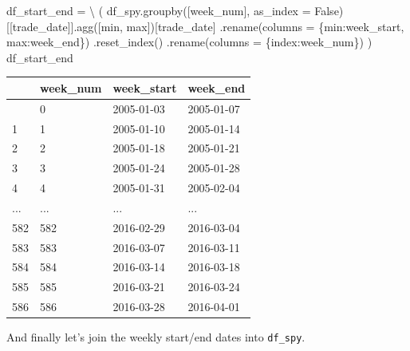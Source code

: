 \documentclass[
  letterpaper,
  DIV=11,
  numbers=noendperiod]{scrreprt}
\newenvironment{Shaded}{\begin{snugshade}}{\end{snugshade}}
\newcommand{\BuiltInTok}[1]{\textcolor[rgb]{0.00,0.23,0.31}{#1}}
\newcommand{\NormalTok}[1]{\textcolor[rgb]{0.00,0.23,0.31}{#1}}
\newcommand{\OperatorTok}[1]{\textcolor[rgb]{0.37,0.37,0.37}{#1}}
\newcommand{\StringTok}[1]{\textcolor[rgb]{0.13,0.47,0.30}{#1}}
\newcommand{\VariableTok}[1]{\textcolor[rgb]{0.07,0.07,0.07}{#1}}
\begin{document}
\begin{Shaded}
\begin{Highlighting}[]
\NormalTok{df\_start\_end }\OperatorTok{=} \OperatorTok{\textbackslash{}}
\NormalTok{    (}
\NormalTok{    df\_spy.groupby([}\StringTok{\textquotesingle{}week\_num\textquotesingle{}}\NormalTok{], as\_index }\OperatorTok{=} \VariableTok{False}\NormalTok{)[[}\StringTok{\textquotesingle{}trade\_date\textquotesingle{}}\NormalTok{]].agg([}\BuiltInTok{min}\NormalTok{, }\BuiltInTok{max}\NormalTok{])[}\StringTok{\textquotesingle{}trade\_date\textquotesingle{}}\NormalTok{]}
\NormalTok{    .rename(columns }\OperatorTok{=}\NormalTok{ \{}\StringTok{\textquotesingle{}min\textquotesingle{}}\NormalTok{:}\StringTok{\textquotesingle{}week\_start\textquotesingle{}}\NormalTok{, }\StringTok{\textquotesingle{}max\textquotesingle{}}\NormalTok{:}\StringTok{\textquotesingle{}week\_end\textquotesingle{}}\NormalTok{\})}
\NormalTok{    .reset\_index()}
\NormalTok{    .rename(columns }\OperatorTok{=}\NormalTok{ \{}\StringTok{\textquotesingle{}index\textquotesingle{}}\NormalTok{:}\StringTok{\textquotesingle{}week\_num\textquotesingle{}}\NormalTok{\})}
\NormalTok{    )}
\NormalTok{df\_start\_end}
\end{Highlighting}
\end{Shaded}

\begin{longtable}[]{@{}llll@{}}
\toprule\noalign{}
& week\_num & week\_start & week\_end \\
\midrule\noalign{}
\endhead
\bottomrule\noalign{}
\endlastfoot
0 & 0 & 2005-01-03 & 2005-01-07 \\
1 & 1 & 2005-01-10 & 2005-01-14 \\
2 & 2 & 2005-01-18 & 2005-01-21 \\
3 & 3 & 2005-01-24 & 2005-01-28 \\
4 & 4 & 2005-01-31 & 2005-02-04 \\
... & ... & ... & ... \\
582 & 582 & 2016-02-29 & 2016-03-04 \\
583 & 583 & 2016-03-07 & 2016-03-11 \\
584 & 584 & 2016-03-14 & 2016-03-18 \\
585 & 585 & 2016-03-21 & 2016-03-24 \\
586 & 586 & 2016-03-28 & 2016-04-01 \\
\end{longtable}

And finally let's join the weekly start/end dates into \texttt{df\_spy}.
\end{document}
